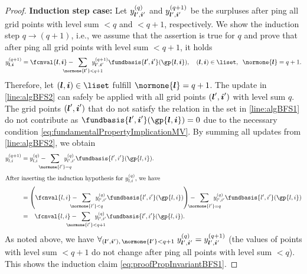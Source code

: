 \begin{proof}
  \noindent
  \textbf{Induction step case:}
  Let $\linout[(q)]{\*l',\*i'}$ and
  $\linout[(q+1)]{\*l',\*i'}$
  be the surpluses after \pop{}ping all
  grid points with level sum $< q$ and $< q + 1$, respectively.
  We show the induction step $q \to (q + 1)$, i.e.,
  we assume that the assertion is true for $q$
  and prove that after \pop{}ping all grid points with level sum $< q + 1$,
  it holds
  \begin{equation}
    \label{eq:proofPropInvariantBFS1}
    \linout[(q+1)]{\*l,\*i}
    = \fcnval{\*l,\*i} -
    \largesum{\normone{\*l'} < q+1} \linout[(q+1)]{\*l',\*i'}
    \fundbasis{\*l',\*i'}(\gp{\*l,\*i}),\quad
    (\*l, \*i) \in \liset,\;\;
    \normone{\*l} = q+1.
  \end{equation}
  Therefore, let $(\*l, \*i) \in \liset$ fulfill $\normone{\*l} = q+1$.
  The update in \cref{line:algBFS2} can safely be applied
  with all grid points $({\boldsymbol{l}}', {\boldsymbol{i}}')$ with level sum $q$.
  The grid points $({\boldsymbol{l}}', {\boldsymbol{i}}')$ that do not satisfy the relation in the set in
  \cref{line:algBFS1} do not contribute as
  $\fundbasis{\*l',\*i'}(\gp{\*l,\*i}) = 0$
  due to the necessary condition \eqref{eq:fundamentalPropertyImplicationMV}.
  By summing all updates from \cref{line:algBFS2}, we obtain
  \begin{subequations}
    \begin{align}
      \linout[(q+1)]{\*l,\*i}
      &= \linout[(q)]{\*l,\*i} -
      \largesum{\normone{\*l'} = q} \linout[(q)]{\*l',\*i'}
      \fundbasis{\*l',\*i'}(\gp{\*l,\*i}).\\
      \intertext{%
        After inserting the induction hypothesis
        for $\linout[(q)]{\*l,\*i}$, we have%
      }
      &= \paren*{
        \fcnval{\*l,\*i} -
        \largesum{\normone{\*l'} < q} \linout[(q)]{\*l',\*i'}
        \fundbasis{\*l',\*i'}(\gp{\*l,\*i})
      } -
      \largesum{\normone{\*l'} = q} \linout[(q)]{\*l',\*i'}
      \fundbasis{\*l',\*i'}(\gp{\*l,\*i})\\
      &= \hphantom{\Biggl(}\fcnval{\*l,\*i} -
      \largesum{\normone{\*l'} < q + 1} \linout[(q)]{\*l',\*i'}
      \fundbasis{\*l',\*i'}(\gp{\*l,\*i}).
    \end{align}
  \end{subequations}
  As noted above, we have
  $\fa{(\*l', \*i'),\, \normone{\*l'} < q + 1}{
    \linout[(q)]{\*l',\*i'} = \linout[(q+1)]{\*l',\*i'}
  }$
  (the values of points with level sum $< q + 1$
  do not change after \pop{}ping all points with level sum $< q$).
  This shows the induction claim \eqref{eq:proofPropInvariantBFS1}.
\end{proof}



